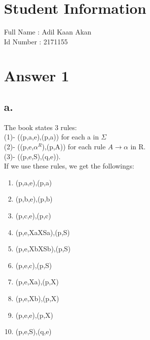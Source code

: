 \documentclass[12pt]{article}
\begin{document}
\section*{Student Information } 
Full Name :  Adil Kaan Akan\\
Id Number :  2171155\\

\section*{Answer 1}

\subsection*{a.}
The book states 3 rules:\\
(1)- ((p,a,e),(p,a)) for each a in $\Sigma$ \\
(2)- ((p,e,$\alpha^R$),(p,A)) for each rule $A \rightarrow \alpha$ in R.\\
(3)- ((p,e,S),(q,e)).\\
If we use these rules, we get the followings:\\
\begin{enumerate}
  \item (p,a,e),(p,a)
  \item (p,b,e),(p,b)
  \item (p,c,e),(p,c)
  \item (p,e,XaXSa),(p,S)
  \item (p,e,XbXSb),(p,S)
  \item (p,e,c),(p,S)
  \item (p,e,Xa),(p,X)
  \item (p,e,Xb),(p,X)
  \item (p,e,e),(p,X)
  \item (p,e,S),(q,e)
\end{enumerate}
\end{document}
